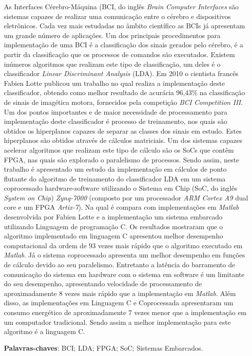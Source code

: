 \begin{resumo}

As Interfaces Cérebro-Máquina (BCI, do inglês \textit{Brain Computer Interfaces} são sistemas capazes de realizar uma comunicação entre o cérebro e dispositivos eletrônicos. Cada vez mais estudadas no âmbito científico as BCIs já apresentam um grande número de aplicações. Um dos principais procedimentos para implementação de uma BCI é a classificação dos sinais gerados pelo cérebro, é a partir da classificação que os processos de comandos são executados. Existem inúmeros algoritmos que realizam este tipo de classificação, um deles é o classificador \textit{Linear Discriminant  Analysis} (LDA). Em 2010 o cientista francês Fabien Lotte publicou um trabalho no qual realiza a implementação deste classificador, obtendo como melhor resultado de acurácia 96,43\% na classificação de sinais de imagética motora, fornecidos pela competição \textit{BCI Competition III}. Um dos pontos importantes e de maior necessidade de processamento para implementação deste classificador é processo de treinamento, nos quais são obtidos os hiperplanos capazes de separar as classes dos sinais em estudo. Estes hiperplanos são obtidos através de cálculos matriciais. Um dos sistemas capazes acelerar algoritmos que realizam este tipo de cálculo são os SoCs que contêm FPGA, nas quais são explorado o paralelismo de processos.
Sendo assim, neste trabalho é apresentado um estudo da implementação em cálculos de ponto flutante do algoritmo de treinamento do classificador LDA em um sistema coprocessado hardware-software utilizando o Sistema em Chip (SoC, do inglês \textit{System on Chip}) \textit{Zynq-7000} (composto por  um processador \textit{ARM Cortex A9} dual core e um FPGA \textit{Artix-7}). Na qual é compara com implementações em \textit{Matlab} desenvolvida por Fabien Lotte e a implementação um sistema embarcado utilizando Linguagem de programação C. Os resultados mostraram que o algoritmo implementado em linguagem C apresentou melhor desempenho computacional da ordem de 93 vezes mais rápido que o algoritmo executado em \textit{Matlab}. Já o sistema coprocessado apresenta um melhor desempenho em funções de cálculo devido ao seu paralelismo. Entretanto a latência do barramento de comunicação do sistema em hardware com o sistema em software é um limitante do seu desempenho, apresentando velocidade de processamento de aproximadamente 8 vezes mais rápido que a implementação em \textit{Matlab}. Além disso, as implementações em Linguagem C e Coprocessada apresentaram um consumo energético de aproximadamente 7 vezes menor que a implementação em um computador tradicional. Sendo assim a melhor implementação para este algoritmo é a linguagem C.


 \vspace{\onelineskip}
 
 \noindent
 \textbf{Palavras-chaves}: BCI; LDA; FPGA; SoC; Sistemas Embarcados.
\end{resumo}
